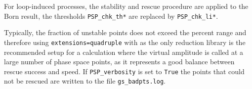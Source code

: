 For loop-induced processes, the stability and rescue procedure are
applied to the Born result, the thresholds \texttt{PSP\_chk\_th*} are
replaced by \texttt{PSP\_chk\_li*}.

\vspace*{3mm}

Typically, the fraction of unstable points does not exceed the percent range and
therefore using \texttt{extensions}\texttt{=quadruple} with \ninja as
the only reduction library is the recommended setup for a calculation
where the virtual amplitude is called at a large number of phase space
points, as it represents a good balance between rescue success and speed.
If \texttt{PSP\_verbosity} is set to \texttt{True} the points that
could not be rescued are written to the file \texttt{gs\_badpts.log}.